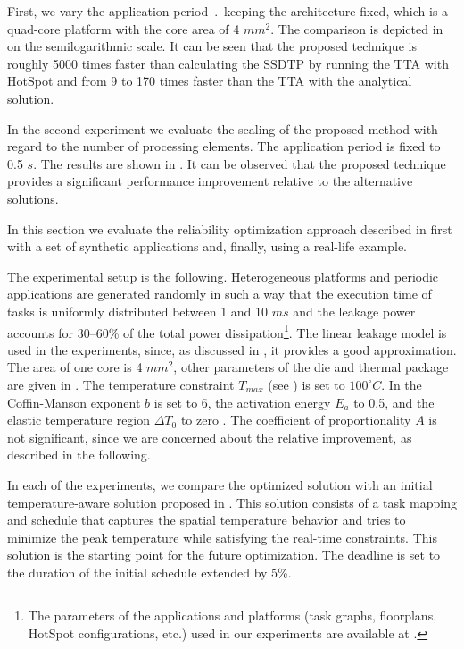 First, we vary the application period $\period$ keeping the architecture fixed, which is a quad-core platform with the core area of 4 $mm^2$. The comparison is depicted in  on the semilogarithmic scale. It can be seen that the proposed technique is roughly 5000 times faster than calculating the SSDTP by running the TTA with HotSpot and from 9 to 170 times faster than the TTA with the analytical solution.

In the second experiment we evaluate the scaling of the proposed method with regard to the number of processing elements. The application period is fixed to 0.5 $s$. The results are shown in . It can be observed that the proposed technique provides a significant performance improvement relative to the alternative solutions.

 \label{sec:reliability-results}
In this section we evaluate the reliability optimization approach described in  first with a set of synthetic applications and, finally, using a real-life example.

The experimental setup is the following. Heterogeneous platforms and periodic applications are generated randomly \cite{dick1998} in such a way that the execution time of tasks is uniformly distributed between 1 and 10 $ms$ and the leakage power accounts for 30--60\% of the total power dissipation\footnote{The parameters of the applications and platforms (task graphs, floorplans, HotSpot configurations, etc.) used in our experiments are available at \cite{liu2011}.}. The linear leakage model is used in the experiments, since, as discussed in , it provides a good approximation. The area of one core is 4 $mm^2$, other parameters of the die and thermal package are given in . The temperature constraint $T_{max}$ (see ) is set to $100^\circ C$. In  the Coffin-Manson exponent $b$ is set to 6, the activation energy $E_a$ to 0.5, and the elastic temperature region $\Delta T_0$ to zero \cite{jedec2010}. The coefficient of proportionality $A$ is not significant, since we are concerned about the relative improvement, as described in the following.

In each of the experiments, we compare the optimized solution with an initial temperature-aware solution proposed in \cite{xie2006}. This solution consists of a task mapping and schedule that captures the spatial temperature behavior and tries to minimize the peak temperature while satisfying the real-time constraints. This solution is the starting point for the future optimization. The deadline is set to the duration of the initial schedule extended by 5\%.

